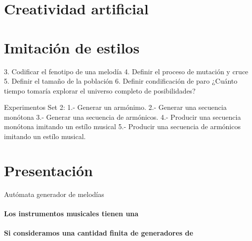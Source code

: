 \section{Creatividad artificial}


\section{Imitación de estilos}
  3. Codificar el fenotipo de una melodía
  4. Definir el proceso de mutación y cruce
  5. Definir el tamaño de la población
  6. Definir condificación de paro
    ¿Cuánto tiempo tomaría explorar el universo completo de posibilidades?

    Experimentos Set 2:
    1.- Generar un armónimo.
    2.- Generar una secuencia monótona
    3.- Generar una secuencia de armónicos.
    4.- Producir una secuencia monótona imitando un estílo musical
    5.- Producir una secuencia de armónicos imitando un estílo musical.


\section{Presentación}

  Autómata generador de melodías

  \paragraph{Los instrumentos musicales tienen una}
  \paragraph{Si consideramos una cantidad finita de generadores de }
